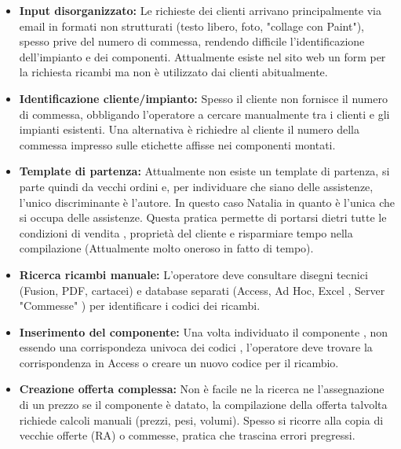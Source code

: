 \documentclass[12pt, a4paper]{article} %
\begin{document}
\begin{itemize}
      \item \textbf{Input disorganizzato:} Le richieste dei clienti arrivano principalmente via email in formati non strutturati (testo libero, foto, "collage con Paint"),
            spesso prive del numero di commessa, rendendo difficile l'identificazione dell'impianto e dei componenti.
            Attualmente esiste nel sito web un form per la richiesta ricambi ma non è utilizzato dai clienti abitualmente.
      \item \textbf{Identificazione cliente/impianto:} Spesso il cliente non fornisce il numero di commessa, obbligando l'operatore a cercare manualmente tra i clienti e gli impianti esistenti.
            Una alternativa è richiedre al cliente il numero della commessa impresso sulle etichette affisse nei componenti montati.
      \item \textbf{Template di partenza:} Attualmente non esiste un template di partenza, si parte quindi da vecchi ordini e, per individuare che siano delle assistenze, l'unico discriminante è l'autore.
            In questo caso Natalia in quanto è l'unica che si occupa delle assistenze. Questa pratica permette di portarsi dietri tutte le condizioni di vendita ,
            proprietà del cliente e risparmiare tempo nella compilazione (Attualmente molto oneroso in fatto di tempo).
      \item \textbf{Ricerca ricambi manuale:} L'operatore deve consultare disegni tecnici (Fusion, PDF, cartacei) e database separati (Access, Ad Hoc, Excel , Server "Commesse" ) per identificare i codici dei ricambi.
      \item \textbf{Inserimento del componente:} Una volta individuato il componente , non essendo una corrispondeza univoca dei codici ,
            l'operatore deve trovare la corrispondenza in Access o creare un nuovo codice per il ricambio.
      \item \textbf{Creazione offerta complessa:} Non è facile ne la ricerca ne l'assegnazione di un prezzo se il componente è datato, la compilazione della offerta talvolta richiede calcoli manuali
            (prezzi, pesi, volumi). Spesso si ricorre alla copia di vecchie offerte (RA) o commesse, pratica che trascina errori pregressi.
\end{itemize}
\end{document}
